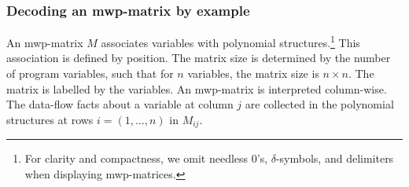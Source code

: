 \subsubsection{Decoding an mwp-matrix by example}
\label{subsec:read-mat}

An mwp-matrix \(M\) associates variables with polynomial structures.\footnote{
    For clarity and compactness, we omit needless \(0\)'s, \(\delta\)-symbols, and delimiters when displaying mwp-matrices.}
This association is defined by position.
The matrix size is determined by the number of program variables, such that for \(n\) variables, the matrix size is \(n \times n\).
The matrix is labelled by the variables. %
An mwp-matrix is interpreted {column-wise}.
The data-flow facts about a variable at column \(j\) are collected in the polynomial structures at rows \(i=(1, \ldots, n)\) in \(M_{ij}\).

